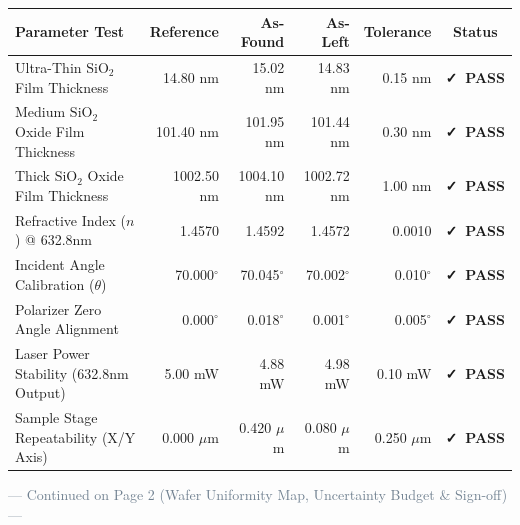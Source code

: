\documentclass[10pt,a4paper]{scrartcl}
\newcommand{\passstatus}{\textcolor{PassGreen}{\textbf{\faCheck\ PASS}}}
\begin{document}
\vspace{1pt}

\begin{tcolorbox}[sectionbox, title={\faList\ SECTION 4: MULTI-POINT MEASUREMENT RESULTS (AS-FOUND VS. AS-LEFT)}]
\small
\begin{tabularx}{\textwidth}{@{}X r r r r c@{}}
  \toprule
  \textbf{Parameter Test} & \textbf{Reference} & \textbf{As-Found} & \textbf{As-Left} & \textbf{Tolerance} & \textbf{Status} \\
  \midrule
  \rowcolor{TableAlt}
  Ultra-Thin $\text{SiO}_2$ Film Thickness & 14.80 nm & 15.02 nm & 14.83 nm & \textpm{} 0.15 nm & \passstatus \\
  Medium $\text{SiO}_2$ Oxide Film Thickness & 101.40 nm & 101.95 nm & 101.44 nm & \textpm{} 0.30 nm & \passstatus \\
  \rowcolor{TableAlt}
  Thick $\text{SiO}_2$ Oxide Film Thickness & 1002.50 nm & 1004.10 nm & 1002.72 nm & \textpm{} 1.00 nm & \passstatus \\
  Refractive Index ($n$) @ 632.8nm & 1.4570 & 1.4592 & 1.4572 & \textpm{} 0.0010 & \passstatus \\
  \rowcolor{TableAlt}
  Incident Angle Calibration ($\theta$) & 70.000$^\circ$ & 70.045$^\circ$ & 70.002$^\circ$ & \textpm{} 0.010$^\circ$ & \passstatus \\
  Polarizer Zero Angle Alignment & 0.000$^\circ$ & 0.018$^\circ$ & 0.001$^\circ$ & \textpm{} 0.005$^\circ$ & \passstatus \\
  \rowcolor{TableAlt}
  Laser Power Stability (632.8nm Output) & 5.00 mW & 4.88 mW & 4.98 mW & \textpm{} 0.10 mW & \passstatus \\
  Sample Stage Repeatability (X/Y Axis) & 0.000 \ensuremath{\mu}m & 0.420 \ensuremath{\mu}m & 0.080 \ensuremath{\mu}m & \textpm{} 0.250 \ensuremath{\mu}m & \passstatus \\
  \bottomrule
\end{tabularx}
\end{tcolorbox}

\vfill
\begin{center}
  \textcolor{SlateGrey}{\scriptsize --- Continued on Page 2 (Wafer Uniformity Map, Uncertainty Budget \& Sign-off) ---}
\end{center}

\newpage
\end{document}
